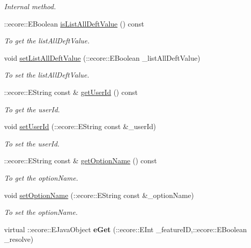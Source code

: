 \begin{DoxyCompactItemize}
\begin{DoxyCompactList}\small\item\em Internal method. \item\end{DoxyCompactList}\item 
::ecore::EBoolean \hyperlink{classUMS__Data_1_1ListOptOptions_a7b7e98bc9188f55af5d973018a4df82a}{isListAllDeftValue} () const 
\begin{DoxyCompactList}\small\item\em To get the listAllDeftValue. \item\end{DoxyCompactList}\item 
void \hyperlink{classUMS__Data_1_1ListOptOptions_aec186748a43d7aa7be85a24de66f49f3}{setListAllDeftValue} (::ecore::EBoolean \_\-listAllDeftValue)
\begin{DoxyCompactList}\small\item\em To set the listAllDeftValue. \item\end{DoxyCompactList}\item 
::ecore::EString const \& \hyperlink{classUMS__Data_1_1ListOptOptions_a775b8797cb172b75f29082b8572395d7}{getUserId} () const 
\begin{DoxyCompactList}\small\item\em To get the userId. \item\end{DoxyCompactList}\item 
void \hyperlink{classUMS__Data_1_1ListOptOptions_a225df02e8df0901f9992857dcf59aa2f}{setUserId} (::ecore::EString const \&\_\-userId)
\begin{DoxyCompactList}\small\item\em To set the userId. \item\end{DoxyCompactList}\item 
::ecore::EString const \& \hyperlink{classUMS__Data_1_1ListOptOptions_a65b105074c6c8ee9f6e34bd379d54f6a}{getOptionName} () const 
\begin{DoxyCompactList}\small\item\em To get the optionName. \item\end{DoxyCompactList}\item 
void \hyperlink{classUMS__Data_1_1ListOptOptions_aea19d18d9aadf6a07f71bb692ad6d45f}{setOptionName} (::ecore::EString const \&\_\-optionName)
\begin{DoxyCompactList}\small\item\em To set the optionName. \item\end{DoxyCompactList}\item 
\hypertarget{classUMS__Data_1_1ListOptOptions_a94c839e2b48b78be8556be11472bc71e}{
virtual ::ecore::EJavaObject {\bfseries eGet} (::ecore::EInt \_\-featureID,::ecore::EBoolean \_\-resolve)}
\label{classUMS__Data_1_1ListOptOptions_a94c839e2b48b78be8556be11472bc71e}


\end{DoxyCompactItemize}
